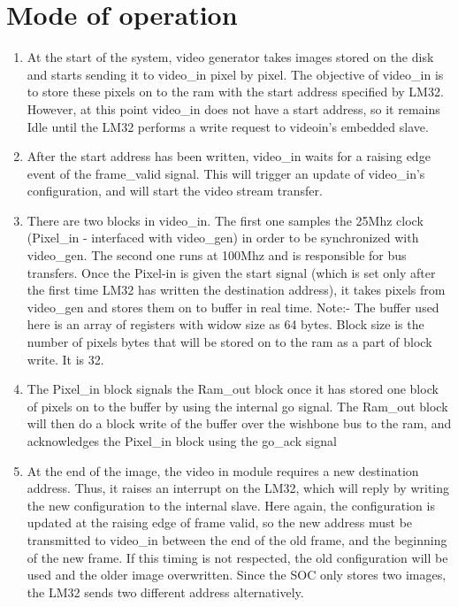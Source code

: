 
\section{Mode of operation}

\begin{enumerate}

\item At the start of the system, video generator takes images stored on the disk and starts sending it to video\_in pixel by pixel. The objective of video\_in is to store these pixels on to the ram with the start address specified by LM32. However, at this point video\_in does not have a start address, so it remains Idle until the LM32 performs a write request to videoin's embedded slave.

\item After the start address has been written, video\_in waits for a raising edge event of the frame\_valid signal. This will trigger an update of video\_in's configuration, and will start the video stream transfer.

\item There are two blocks in video\_in. The first one samples the 25Mhz clock (Pixel\_in - interfaced with video\_gen) in order to be synchronized with video\_gen. The second one runs at 100Mhz and is responsible for bus transfers. Once the Pixel-in is given the start signal (which is set only after the first time LM32 has written the destination address), it takes pixels from video\_gen and stores them on to buffer in real time.
Note:- The buffer used here is an array of registers with widow size as 64 bytes. Block size is the number of pixels bytes that will be stored on to the ram as a part of block write. It is 32.

\item The Pixel\_in block signals the Ram\_out block once it has stored one block of pixels on to the buffer by using the internal go signal. The Ram\_out block will then do a block write of the buffer over the wishbone bus to the ram, and acknowledges the Pixel\_in block using the go\_ack signal

\item At the end of the image, the video in module requires a new destination address. Thus, it raises an interrupt on the LM32, which will reply by writing the new configuration to the internal slave. Here again, the configuration is updated at the raising edge of frame valid, so the new address must be transmitted to video\_in between the end of the old frame, and the beginning of the new frame. If this timing is not respected, the old configuration will be used and the older image overwritten. Since the SOC only stores two images, the LM32 sends two different address alternatively.


\end{enumerate}
